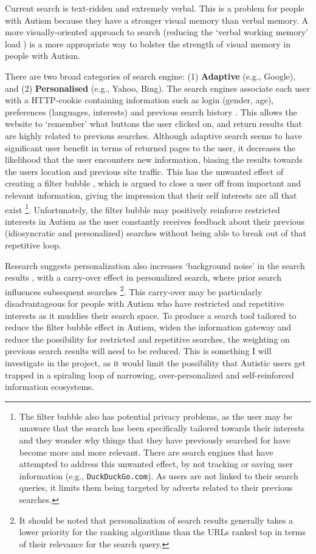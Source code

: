 \documentclass[a4paper, 11pt]{article}
\begin{document}
\begin{justify}
Current search is text-ridden and extremely verbal. This is a problem for people with Autism because they have a stronger visual memory \cite{fabienne} than verbal memory. A more visually-oriented approach to search (reducing the `verbal working memory' load \cite{workingmem}) is a more appropriate way to bolster the strength of visual memory in people with Autism.

There are two broad categories of search engine: (1) \textbf{Adaptive} (e.g., Google), and (2) \textbf{Personalised} (e.g., Yahoo, Bing). The search engines associate each user with a HTTP-cookie containing information such as login (gender, age), preferences (languages, interests) and previous search history \cite{googlepersonalised, yahooadaptive, bingadaptive}. This allows the website to `remember' what buttons the user clicked on, and return results that are highly related to previous searches. Although adaptive search seems to have significant user benefit in terms of returned pages to the user, it decreases the likelihood that the user encounters new information, biasing the results towards the users location and previous site traffic.  This has the unwanted effect of creating a filter bubble \cite{Pariser}, which is argued to close a user off from important and relevant information, giving the impression that their self interests are all that exist \footnote{The filter bubble also has potential privacy problems, as the user may be unaware that the search has been specifically tailored towards their interests and they wonder why things that they have previously searched for have become more and more relevant. There are search engines that have attempted to address this unwanted effect, by not tracking or saving user information (e.g., \texttt{DuckDuckGo.com}). As users are not linked to their search queries, it limits them being targeted by adverts related to their previous searches.}. Unfortunately, the filter bubble may positively reinforce restricted interests in Autism as the user constantly receives feedback about their previous (idiosyncratic and personalized) searches without being able to break out of that repetitive loop. 

Research suggests personalization also increases ‘background noise’ in the search results \cite{briggs}, with a carry-over effect in personalized search, where prior search influences subsequent searches \footnote{It should be noted that personalization of search results generally takes a lower priority for the ranking algorithms than the URLs ranked top in terms of their relevance for the search query.}. This carry-over may be particularly disadvantageous for people with Autism who have restricted and repetitive interests as it muddies their search space. To produce a search tool tailored to reduce the filter bubble effect in Autism, widen the information gateway and reduce the possibility for restricted and repetitive searches, the weighting on previous search results will need to be reduced. This is something I will investigate in the project, as it would limit the possibility that Autistic users get trapped in a spiraling loop of narrowing, over-personalized and self-reinforced information ecosystems.


\end{justify}
\end{document}
